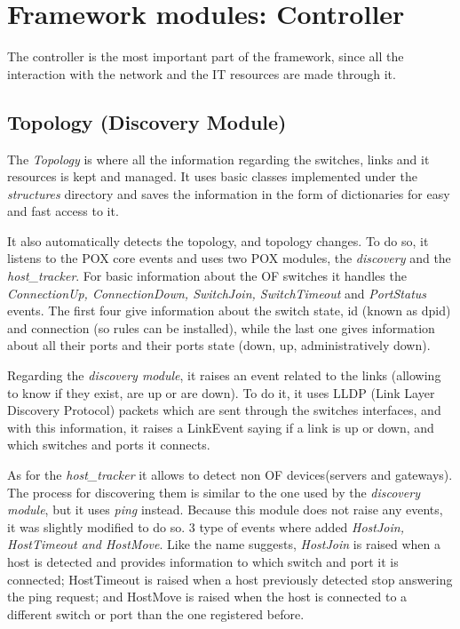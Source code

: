 \documentclass[12pt,english,oneside]{book}
\begin{document}
\newpage

\section{Framework modules: Controller}
\hspace{0.6cm}

The controller is the most important part of the framework, since all the interaction with the network and the IT resources are made through it.

\subsection{Topology (Discovery Module)}
\hspace{0.6cm}

The \textit{Topology} is where all the information regarding the switches, links and it resources is kept and managed. It uses basic classes implemented under the \textit{structures} directory and saves the information in the form of dictionaries for easy and fast access to it.

It also automatically detects the topology, and topology changes. To do so, it listens to the POX core events and uses two POX modules, the \textit{discovery} and the \textit{host\_tracker}.
For basic information about the OF switches it handles the \textit{ConnectionUp, ConnectionDown, SwitchJoin, SwitchTimeout} and \textit{PortStatus} events.
The first four give information about the switch state, id (known as dpid) and connection (so rules can be installed), while the last one gives information about all their ports and their ports state (down, up, administratively down).

Regarding the \textit{discovery module}, it raises an event related to the links (allowing to know if they exist, are up or are down). To do it, it uses LLDP (Link Layer Discovery Protocol) packets which are sent through the switches interfaces, and with this information, it raises a LinkEvent saying if a link is up or down, and which switches and ports it connects.

As for the \textit{host\_tracker} it allows to detect non OF devices(servers and gateways). The process for discovering them is similar to the one used by the \textit{discovery module}, but it uses \textit{ping} instead.
Because this module does not raise any events, it was slightly modified to do so.
$3$ type of events where added \textit{HostJoin, HostTimeout and HostMove}. Like the name suggests, \textit{HostJoin} is raised when a host is detected and provides information to which switch and port it is connected; HostTimeout is raised when a host previously detected stop answering the ping request; and HostMove is raised when the host is connected to a different switch or port than the one registered before.
\end{document}
